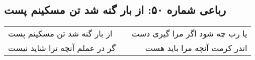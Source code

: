 \begin{center}
\section*{رباعی شماره ۵۰: از بار گنه شد تن مسکینم پست}
\label{sec:sh050}
\begin{longtable}{l p{0.5cm} r}
از بار گنه شد تن مسکینم پست
&&
یا رب چه شود اگر مرا گیری دست
\\
گر در عملم آنچه ترا شاید نیست
&&
اندر کرمت آنچه مرا باید هست
\\
\end{longtable}
\end{center}
